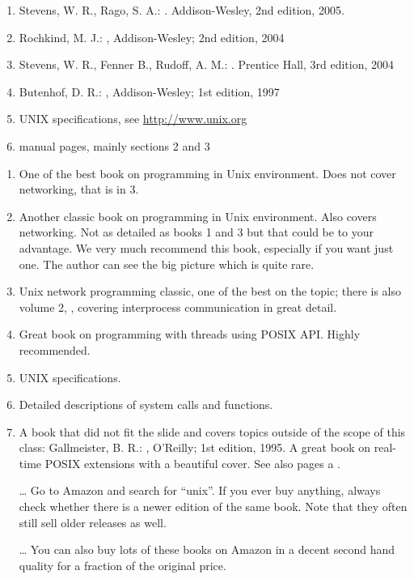 
\begin{slide}
\begin{enumerate}
\item Stevens, W. R., Rago, S. A.: . Addison-Wesley, 2nd edition, 2005.
\item Rochkind, M. J.: ,
Addison-Wesley; 2nd edition, 2004
\item Stevens, W. R., Fenner B., Rudoff, A. M.: . Prentice Hall,
3rd edition, 2004
\item Butenhof, D. R.: ,
Addison-Wesley; 1st edition, 1997
\item UNIX specifications, see \url{http://www.unix.org}
\item manual pages, mainly sections 2 and 3
\end{enumerate}
\end{slide}

\label{REF_PROGRAMMING}

\begin{enumerate}
\item One of the best book on programming in Unix environment.  Does not cover
net\-work\-ing, that is in 3.
\item Another classic book on programming in Unix environment.  Also covers
net\-work\-ing.  Not as detailed as books 1 and 3 but that could be to your
advantage.  We very much recommend this book, especially if you want just one.
The author can see the big picture which is quite rare.
\item Unix network programming classic, one of the best on the topic; there is
also volume 2, , covering interprocess communication in great detail.
\item Great book on programming with threads using POSIX API.  Highly
recommended.
\item UNIX specifications.
\item Detailed descriptions of system calls and functions.
\item \label{POSIX4} A book that did not fit the slide and covers topics outside
of the scope of this class: Gall\-meis\-ter, B. R.: , O'Reilly; 1st edition, 1995.  A great
book on real-time POSIX extensions with a beautiful cover.  See also pages
\pageref{REALTIMEEXTENSIONS} a \pageref{SIGWAITINFO}.
\item[\ldots] Go to Amazon and search for ``unix''.  If you ever buy anything,
always check whether there is a newer edition of the same book.  Note that they
often still sell older releases as well.
\item[\ldots] You can also buy lots of these books on Amazon in a decent second
hand quality for a fraction of the original price.
\end{enumerate}

